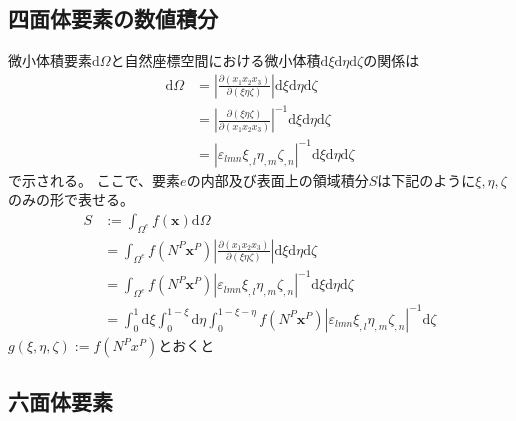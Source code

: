 \documentclass{jarticle}
\begin{document}
\subsection{四面体要素の数値積分}
微小体積要素$\mathrm{d}\Omega$と自然座標空間における微小体積$\mathrm{d}\xi\mathrm{d}\eta\mathrm{d}\zeta$の関係は
\begin{align}
  \mathrm{d}\Omega
  &= \left|\frac{\partial (x_1x_2x_3)}{\partial (\xi\eta\zeta)}\right|\mathrm{d}\xi\mathrm{d}\eta\mathrm{d}\zeta\\
  &= \left|\frac{\partial (\xi\eta\zeta)}{\partial (x_1x_2x_3)}\right|^{-1}\mathrm{d}\xi\mathrm{d}\eta\mathrm{d}\zeta\\
  &= \left|\varepsilon_{lmn}\xi_{,l}\eta_{,m}\zeta_{,n}\right|^{-1}\mathrm{d}\xi\mathrm{d}\eta\mathrm{d}\zeta
\end{align}
で示される。
ここで、要素$e$の内部及び表面上の領域積分$S$は下記のように$\xi, \eta, \zeta$のみの形で表せる。
\begin{align}
  S&:=\int_{\Omega^e}f(\bm{x})\mathrm{d}\Omega\\
  &=\int_{\Omega^e}f(N^P\bm{x}^P)\left|\frac{\partial (x_1x_2x_3)}{\partial (\xi\eta\zeta)}\right|\mathrm{d}\xi\mathrm{d}\eta\mathrm{d}\zeta\\
  &=\int_{\Omega^e}f(N^P\bm{x}^P)\left|\varepsilon_{lmn}\xi_{,l}\eta_{,m}\zeta_{,n}\right|^{-1}\mathrm{d}\xi\mathrm{d}\eta\mathrm{d}\zeta  \\
  &=\int_{0}^1\mathrm{d}\xi\int_{0}^{1-\xi}\mathrm{d}\eta\int_{0}^{1-\xi-\eta}f(N^P\bm{x}^P)\left|\varepsilon_{lmn}\xi_{,l}\eta_{,m}\zeta_{,n}\right|^{-1}\mathrm{d}\zeta 
\end{align}
$g(\xi,\eta,\zeta):=f(N^Px^P)$とおくと
\subsection{六面体要素}
\end{document}
